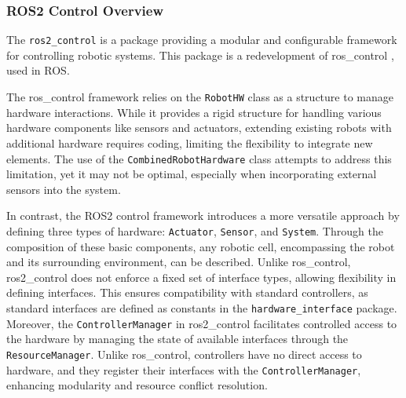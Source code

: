 \subsubsection{ROS2 Control Overview}
The \texttt{ros2\_control} is a package providing a modular and configurable framework for controlling robotic systems. This package is a redevelopment of ros\_control \cite{ros_control}, used in ROS.



The ros\_control framework relies on the \texttt{RobotHW} class as a structure to manage hardware interactions. While it provides a rigid structure for handling various hardware components like sensors and actuators, extending existing robots with additional hardware requires coding, limiting the flexibility to integrate new elements. The use of the \texttt{CombinedRobotHardware} class \cite{ros_combined_robot_hw} attempts to address this limitation, yet it may not be optimal, especially when incorporating external sensors into the system.

In contrast, the ROS2 control framework introduces a more versatile approach by defining three types of hardware: \texttt{Actuator}, \texttt{Sensor}, and \texttt{System}. Through the composition of these basic components, any robotic cell, encompassing the robot and its surrounding environment, can be described. Unlike ros\_control, ros2\_control does not enforce a fixed set of interface types, allowing flexibility in defining interfaces. This ensures compatibility with standard controllers, as standard interfaces are defined as constants in the \texttt{hardware\_interface} package. Moreover, the \texttt{ControllerManager} in ros2\_control facilitates controlled access to the hardware by managing the state of available interfaces through the \texttt{ResourceManager}. Unlike ros\_control, controllers have no direct access to hardware, and they register their interfaces with the \texttt{ControllerManager}, enhancing modularity and resource conflict resolution.


